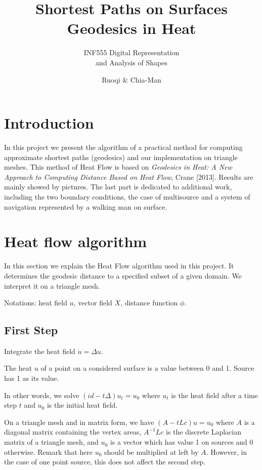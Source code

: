 \documentclass[a4paper,12pt,twoside]{article}
\title{Shortest Paths on Surfaces\\ Geodesics in Heat}
\subtitle{INF555 Digital Representation\\ and Analysis of Shapes }
\author{Ruoqi \bsc{He} \& Chia-Man \bsc{Hung}}
\begin{document}
\maketitle

\section{Introduction}

In this project we present the algorithm of a practical method for computing approximate shortest paths (geodesics) and our implementation on triangle meshes. This method of Heat Flow is based on \textit{Geodesics in Heat: A New Approach to Computing Distance Based on Heat Flow}, Crane [2013]. Results are mainly showed by pictures. The last part is dedicated to additional work, including the two boundary conditions, the case of multisource and a system of navigation represented by a walking man on surface.

\section{Heat flow algorithm}

In this section we explain the Heat Flow algorithm used in this project. It determines the geodesic distance to a specified subset of a given domain. We interpret it on a triangle mesh.

Notations: heat field $u$, vector field $X$, distance function $\phi$.

\subsection{First Step}
Integrate the heat field $\dot{u} = \Delta u$.

The heat $u$ of a point on a considered surface is a value between 0 and 1. Source has 1 as its value.

In other words, we solve $(id - t\Delta)u_t = u_0$ where $u_t$ is the heat field after a time step $t$ and $u_0$ is the initial heat field.

On a triangle mesh and in matrix form, we have $(A - tLc)u = u_0$ where $A$ is a diagonal matrix containing the vertex areas, $A^{-1}Lc$ is the discrete Laplacian matrix of a triangle mesh, and $u_0$ is a vector which has value 1 on sources and 0 otherwise. Remark that here $u_0$ should be multiplied at left by $A$. However, in the case of one point source, this does not affect the second step.
\end{document}
